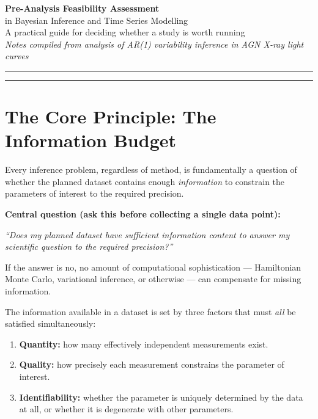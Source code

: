 \documentclass[11pt, a4paper]{article}
\begin{document}
\begin{center}
    {\LARGE \textbf{Pre-Analysis Feasibility Assessment}}\\[6pt]
    {\large in Bayesian Inference and Time Series Modelling}\\[10pt]
    {\normalsize A practical guide for deciding whether a study is worth running}\\[4pt]
    {\small \textit{Notes compiled from analysis of AR(1) variability inference in AGN X-ray light curves}}
\end{center}

\vspace{4pt}
\noindent\rule{\linewidth}{0.8pt}
\vspace{6pt}

\tableofcontents
\vspace{10pt}
\noindent\rule{\linewidth}{0.4pt}

\section{The Core Principle: The Information Budget}

Every inference problem, regardless of method, is fundamentally a question of whether the
planned dataset contains enough \textit{information} to constrain the parameters of interest
to the required precision.

\begin{keybox}
\textbf{Central question (ask this before collecting a single data point):}

\medskip
\textit{``Does my planned dataset have sufficient information content to answer my scientific
question to the required precision?''}

\medskip
If the answer is no, no amount of computational sophistication --- Hamiltonian Monte Carlo,
variational inference, or otherwise --- can compensate for missing information.
\end{keybox}

The information available in a dataset is set by three factors that must \emph{all} be
satisfied simultaneously:
\begin{enumerate}[noitemsep]
    \item \textbf{Quantity:} how many effectively independent measurements exist.
    \item \textbf{Quality:} how precisely each measurement constrains the parameter of interest.
    \item \textbf{Identifiability:} whether the parameter is uniquely determined by the data
          at all, or whether it is degenerate with other parameters.
\end{enumerate}
\end{document}
